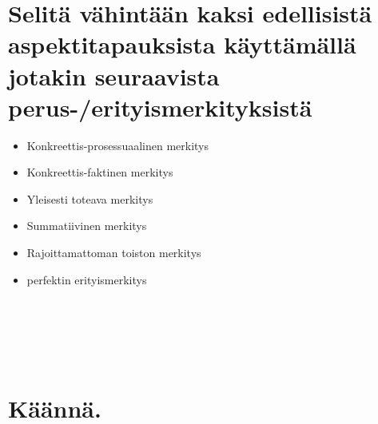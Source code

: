 \documentclass[paper=a4, fontsize=11pt]{scrartcl}
\begin{document}
\section{Selitä vähintään kaksi edellisistä aspektitapauksista käyttämällä jotakin seuraavista perus-/erityismerkityksistä}

{\small
\begin{itemize}
    \item Konkreettis-prosessuaalinen merkitys
    \item Konkreettis-faktinen merkitys
    \item Yleisesti toteava merkitys
    \item Summatiivinen merkitys
    \item Rajoittamattoman toiston merkitys
    \item perfektin erityismerkitys
\end{itemize}
}

\underline{\hspace{\textwidth}} \\[.3cm]
\underline{\hspace{\textwidth}} \\[.3cm]
\underline{\hspace{\textwidth}} \\[.3cm]
\underline{\hspace{\textwidth}} \\[.3cm]



\section{Käännä.}

%
%
%
%
%
%
%
\end{document}
